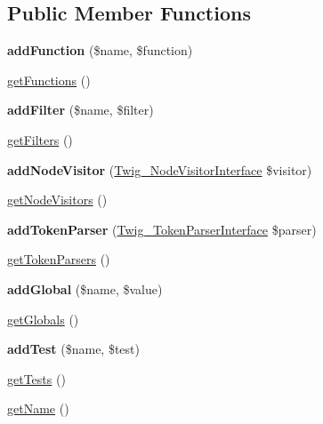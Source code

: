 \subsection*{Public Member Functions}
\begin{DoxyCompactItemize}
\item 
{\bfseries add\+Function} (\$name, \$function)\hypertarget{classTwig__Extension__Staging_a79dd1d3a2f4321bf7196d951c5c18b82}{}\label{classTwig__Extension__Staging_a79dd1d3a2f4321bf7196d951c5c18b82}

\item 
\hyperlink{classTwig__Extension__Staging_accec2d738a575c98c12530978c20b183}{get\+Functions} ()
\item 
{\bfseries add\+Filter} (\$name, \$filter)\hypertarget{classTwig__Extension__Staging_acbda5a5ad850ad67c8d24395ca3968e0}{}\label{classTwig__Extension__Staging_acbda5a5ad850ad67c8d24395ca3968e0}

\item 
\hyperlink{classTwig__Extension__Staging_a714d87f92522c8b913b18b17520b9c14}{get\+Filters} ()
\item 
{\bfseries add\+Node\+Visitor} (\hyperlink{interfaceTwig__NodeVisitorInterface}{Twig\+\_\+\+Node\+Visitor\+Interface} \$visitor)\hypertarget{classTwig__Extension__Staging_a9f91933af271402c735bb1c0808231f8}{}\label{classTwig__Extension__Staging_a9f91933af271402c735bb1c0808231f8}

\item 
\hyperlink{classTwig__Extension__Staging_aeefd1fcb987dd245c8337cd59a92c209}{get\+Node\+Visitors} ()
\item 
{\bfseries add\+Token\+Parser} (\hyperlink{interfaceTwig__TokenParserInterface}{Twig\+\_\+\+Token\+Parser\+Interface} \$parser)\hypertarget{classTwig__Extension__Staging_a90a021d26ea6dfc15c3ff6cc5654e22a}{}\label{classTwig__Extension__Staging_a90a021d26ea6dfc15c3ff6cc5654e22a}

\item 
\hyperlink{classTwig__Extension__Staging_a2374726b1533fef74b27bab24d12ae48}{get\+Token\+Parsers} ()
\item 
{\bfseries add\+Global} (\$name, \$value)\hypertarget{classTwig__Extension__Staging_ae10b8bdc918c68d90d20ce1fd79aeaa3}{}\label{classTwig__Extension__Staging_ae10b8bdc918c68d90d20ce1fd79aeaa3}

\item 
\hyperlink{classTwig__Extension__Staging_a3f0c80b05f50031a73326436871ecfc6}{get\+Globals} ()
\item 
{\bfseries add\+Test} (\$name, \$test)\hypertarget{classTwig__Extension__Staging_ab1b3527e4c073ff6b6c60a9740bd24ae}{}\label{classTwig__Extension__Staging_ab1b3527e4c073ff6b6c60a9740bd24ae}

\item 
\hyperlink{classTwig__Extension__Staging_a963474410d34391b0ac9b5999865c78d}{get\+Tests} ()
\item 
\hyperlink{classTwig__Extension__Staging_a8a609dab686c4d1a34e721f3b86bce23}{get\+Name} ()
\end{DoxyCompactItemize}

